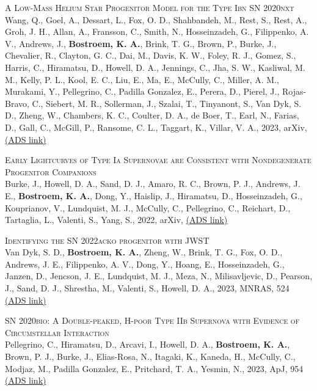 \begin{revnumerate}[67]
\item{\textsc{A Low-Mass Helium Star Progenitor Model for the Type Ibn SN 2020nxt}\\ 
Wang, Q., Goel, A., Dessart, L., Fox, O. D., Shahbandeh, M., Rest, S., Rest, A., Groh, J. H., Allan, A., Fransson, C., Smith, N., Hosseinzadeh, G., Filippenko, A. V., Andrews, J., \textbf{Bostroem, K. A.}, Brink, T. G., Brown, P., Burke, J., Chevalier, R., Clayton, G. C., Dai, M., Davis, K. W., Foley, R. J., Gomez, S., Harris, C., Hiramatsu, D., Howell, D. A., Jennings, C., Jha, S. W., Kasliwal, M. M., Kelly, P. L., Kool, E. C., Liu, E., Ma, E., McCully, C., Miller, A. M., Murakami, Y., Pellegrino, C., Padilla Gonzalez, E., Perera, D., Pierel, J., Rojas-Bravo, C., Siebert, M. R., Sollerman, J., Szalai, T., Tinyanont, S., Van Dyk, S. D., Zheng, W., Chambers, K. C., Coulter, D. A., de Boer, T., Earl, N., Farias, D., Gall, C., McGill, P., Ransome, C. L., Taggart, K., Villar, V. A., 2023, arXiv, 
\color{blue}\href{https://ui.adsabs.harvard.edu/abs/2023arXiv230505015W}{(ADS link)}\color{black}}\\

    \item{\textsc{Early Lightcurves of Type Ia Supernovae are Consistent with Nondegenerate Progenitor Companions}\\ 
    Burke, J., Howell, D. A., Sand, D. J., Amaro, R. C., Brown, P. J., Andrews, J. E., \textbf{Bostroem, K. A.}, Dong, Y., Haislip, J., Hiramatsu, D., Hosseinzadeh, G., Kouprianov, V., Lundquist, M. J., McCully, C., Pellegrino, C., Reichart, D., Tartaglia, L., Valenti, S., Yang, S., 2022, arXiv, 
    \color{blue}\href{https://ui.adsabs.harvard.edu/abs/2022arXiv220707681B}{(ADS link)}\color{black}}\\

  \item{\textsc{Identifying the SN 2022acko progenitor with JWST}\\ 
Van Dyk, S. D., \textbf{Bostroem, K. A.}, Zheng, W., Brink, T. G., Fox, O. D., Andrews, J. E., Filippenko, A. V., Dong, Y., Hoang, E., Hosseinzadeh, G., Janzen, D., Jencson, J. E., Lundquist, M. J., Meza, N., Milisavljevic, D., Pearson, J., Sand, D. J., Shrestha, M., Valenti, S., Howell, D. A., 2023, MNRAS, 524 
\color{blue}\href{https://ui.adsabs.harvard.edu/abs/2023MNRAS.524.2186V}{(ADS link)}\color{black}}\\

\item{\textsc{SN 2020bio: A Double-peaked, H-poor Type IIb Supernova with Evidence of Circumstellar Interaction}\\ 
Pellegrino, C., Hiramatsu, D., Arcavi, I., Howell, D. A., \textbf{Bostroem, K. A.}, Brown, P. J., Burke, J., Elias-Rosa, N., Itagaki, K., Kaneda, H., McCully, C., Modjaz, M., Padilla Gonzalez, E., Pritchard, T. A., Yesmin, N., 2023, ApJ, 954 
\color{blue}\href{https://ui.adsabs.harvard.edu/abs/2023ApJ...954...35P}{(ADS link)}\color{black}}\\


\end{revnumerate}
